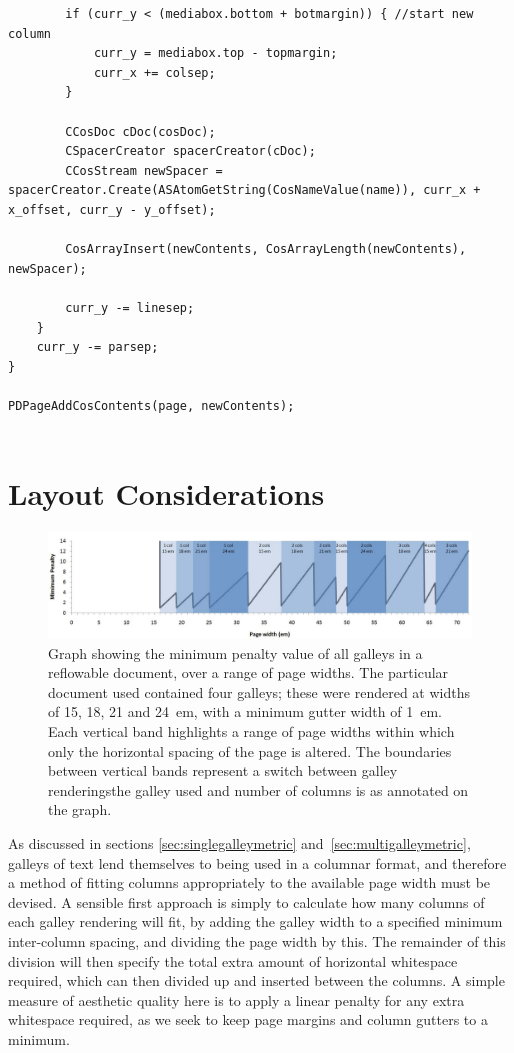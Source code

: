 \begin{lstlisting}
        if (curr_y < (mediabox.bottom + botmargin)) { //start new column
            curr_y = mediabox.top - topmargin;
            curr_x += colsep;
        }
        
        CCosDoc cDoc(cosDoc);
        CSpacerCreator spacerCreator(cDoc);
        CCosStream newSpacer = spacerCreator.Create(ASAtomGetString(CosNameValue(name)), curr_x + x_offset, curr_y - y_offset);
        
        CosArrayInsert(newContents, CosArrayLength(newContents), newSpacer);
        
        curr_y -= linesep;
    }
    curr_y -= parsep;
}

PDPageAddCosContents(page, newContents);


\end{lstlisting}


\section{Layout Considerations}
\begin{figure}
 \includegraphics[width=\textwidth]{gfx/graph-em}
 \caption[Graph of minimum penalty values]{Graph showing the minimum penalty value of all galleys in a reflowable document, over a range of page widths. The particular document used contained four galleys; these were rendered at widths of 15, 18, 21 and 24~em, with a minimum gutter width of 1~em. Each vertical band highlights a range of page widths within which only the horizontal spacing of the page is altered. The boundaries between vertical bands represent a switch between galley renderings\ed{}the galley used and number of columns is as annotated on the graph.}
 \label{fig:penaltygraph}
\end{figure}

As discussed in sections \ref{sec:singlegalleymetric} and~\ref{sec:multigalleymetric}, galleys of text lend themselves to being used in a columnar format, and therefore a method of fitting columns appropriately to the available page width must be devised. A sensible first approach is simply to calculate how many columns of each galley rendering will fit, by adding the galley width to a specified minimum inter-column spacing, and dividing the page width by this. The remainder of this division will then specify the total extra amount of horizontal whitespace required, which can then divided up and inserted between the columns. A simple measure of aesthetic quality here is to apply a linear penalty for any extra whitespace required, as we seek to keep page margins and column gutters to a minimum.

